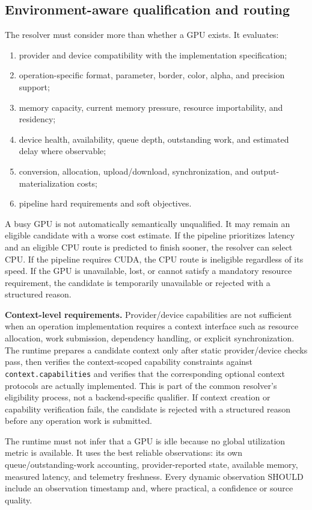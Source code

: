 \documentclass[11pt,a4paper,oneside]{article}
\begin{document}
\subsection{Environment-aware qualification and routing}

The resolver must consider more than whether a GPU exists. It evaluates:
\begin{enumerate}
  \item provider and device compatibility with the implementation specification;
  \item operation-specific format, parameter, border, color, alpha, and precision support;
  \item memory capacity, current memory pressure, resource importability, and residency;
  \item device health, availability, queue depth, outstanding work, and estimated delay where observable;
  \item conversion, allocation, upload/download, synchronization, and output-materialization costs;
  \item pipeline hard requirements and soft objectives.
\end{enumerate}

A busy GPU is not automatically semantically unqualified. It may remain an eligible candidate with a worse cost estimate. If the pipeline prioritizes latency and an eligible CPU route is predicted to finish sooner, the resolver can select CPU. If the pipeline requires CUDA, the CPU route is ineligible regardless of its speed. If the GPU is unavailable, lost, or cannot satisfy a mandatory resource requirement, the candidate is temporarily unavailable or rejected with a structured reason.

\textbf{Context-level requirements.} Provider/device capabilities are not sufficient when an operation implementation requires a context interface such as resource allocation, work submission, dependency handling, or explicit synchronization. The runtime prepares a candidate context only after static provider/device checks pass, then verifies the context-scoped capability constraints against \texttt{context.capabilities} and verifies that the corresponding optional context protocols are actually implemented. This is part of the common resolver's eligibility process, not a backend-specific qualifier. If context creation or capability verification fails, the candidate is rejected with a structured reason before any operation work is submitted.

The runtime must not infer that a GPU is idle because no global utilization metric is available. It uses the best reliable observations: its own queue/outstanding-work accounting, provider-reported state, available memory, measured latency, and telemetry freshness. Every dynamic observation SHOULD include an observation timestamp and, where practical, a confidence or source quality.
\end{document}
